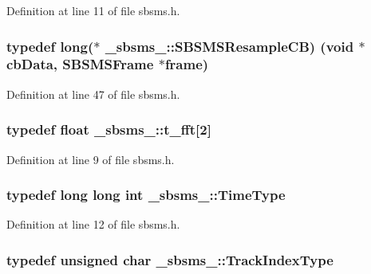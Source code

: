 Definition at line 11 of file sbsms.\+h.

\subsubsection[{\texorpdfstring{S\+B\+S\+M\+S\+Resample\+CB}{SBSMSResampleCB}}]{\setlength{\rightskip}{0pt plus 5cm}typedef long($\ast$ \+\_\+sbsms\+\_\+\+::\+S\+B\+S\+M\+S\+Resample\+CB) ({\bf void} $\ast$cb\+Data, {\bf S\+B\+S\+M\+S\+Frame} $\ast$frame)}\hypertarget{namespace__sbsms___a1b88e19baa604934b1c3cdec1fae8d4b}{}\label{namespace__sbsms___a1b88e19baa604934b1c3cdec1fae8d4b}


Definition at line 47 of file sbsms.\+h.

\subsubsection[{\texorpdfstring{t\+\_\+fft}{t_fft}}]{\setlength{\rightskip}{0pt plus 5cm}typedef float \+\_\+sbsms\+\_\+\+::t\+\_\+fft\mbox{[}2\mbox{]}}\hypertarget{namespace__sbsms___af5c6f976b2da21c36853e3b0c5995a54}{}\label{namespace__sbsms___af5c6f976b2da21c36853e3b0c5995a54}


Definition at line 9 of file sbsms.\+h.

\subsubsection[{\texorpdfstring{Time\+Type}{TimeType}}]{\setlength{\rightskip}{0pt plus 5cm}typedef long long {\bf int} {\bf \+\_\+sbsms\+\_\+\+::\+Time\+Type}}\hypertarget{namespace__sbsms___a3a161c3deff71e932c0ec86aad54eb7c}{}\label{namespace__sbsms___a3a161c3deff71e932c0ec86aad54eb7c}


Definition at line 12 of file sbsms.\+h.

\subsubsection[{\texorpdfstring{Track\+Index\+Type}{TrackIndexType}}]{\setlength{\rightskip}{0pt plus 5cm}typedef unsigned char {\bf \+\_\+sbsms\+\_\+\+::\+Track\+Index\+Type}}\hypertarget{namespace__sbsms___a92908dbd644f9cd709ffe3608e9e4510}{}\label{namespace__sbsms___a92908dbd644f9cd709ffe3608e9e4510}


